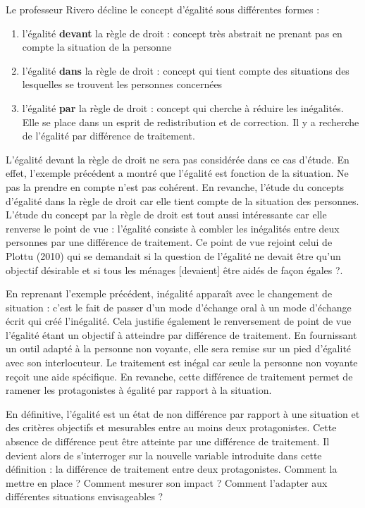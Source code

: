 Le professeur Rivero \cite{Rivero1966} décline le concept d'égalité sous différentes formes : 
\begin{enumerate}
\item l'égalité \textbf{devant} la règle de droit : concept très abstrait ne prenant pas en compte la situation de la personne
\item l'égalité \textbf{dans} la règle de droit : concept qui tient compte des situations des lesquelles se trouvent les personnes concernées
\item l'égalité \textbf{par} la règle de droit : concept qui cherche à réduire les inégalités. Elle se place dans un esprit de redistribution et de correction. Il y a recherche de l'égalité par différence de traitement.
\end{enumerate}

L'égalité devant la règle de droit ne sera pas considérée dans ce cas d'étude. En effet, l'exemple précédent a montré que l'égalité est fonction de la situation. Ne pas la prendre en compte n'est pas cohérent. En revanche, l'étude du concepts d'égalité dans la règle de droit car elle tient compte de la situation des personnes. L'étude du concept par la règle de droit est tout aussi intéressante car elle renverse le point de vue : l'égalité consiste à combler les inégalités entre deux personnes par une différence de traitement. Ce point de vue rejoint celui de Plottu (2010) \cite{Plottu2010} qui se demandait si la question de l'égalité ne devait être \og qu'un objectif désirable \fg{} et si \og tous les ménages [devaient] être aidés de façon égales ?\fg{}. 

En reprenant l'exemple précédent, inégalité apparaît avec le changement de situation : c'est le fait de passer d'un mode d'échange oral à un mode d'échange écrit qui créé l'inégalité. Cela justifie également le renversement de point de vue l'égalité étant un objectif à atteindre par différence de traitement. En fournissant un outil adapté à la personne non voyante, elle sera remise sur un pied d'égalité avec son interlocuteur. Le traitement est inégal car seule la personne non voyante reçoit une aide spécifique. En revanche, cette différence de traitement permet de ramener les protagonistes à égalité par rapport à la situation. 

En définitive, l'égalité est un état de non différence par rapport à une situation et des critères objectifs et mesurables entre au moins deux protagonistes. Cette absence de différence peut être atteinte par une différence de traitement. Il devient alors de s'interroger sur la nouvelle variable introduite dans cette définition : la différence de traitement entre deux protagonistes. Comment la mettre en place ? Comment mesurer son impact ? Comment l'adapter aux différentes situations envisageables ?



